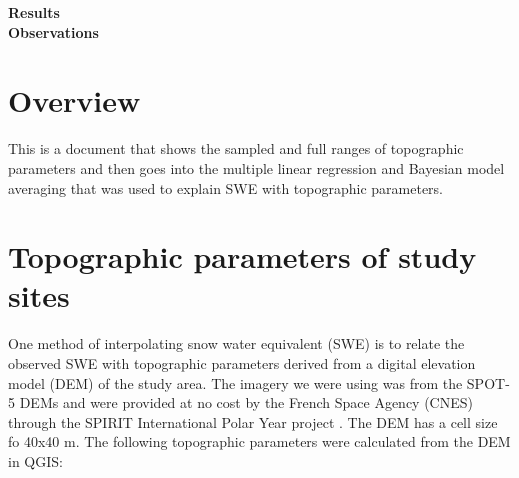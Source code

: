 \documentclass[12pt]{article}
\begin{document}

\begin{center}
\Large \textbf{Results\\ Observations}
\end{center}


\section*{Overview}
This is a document that shows the sampled and full ranges of topographic parameters and then goes into the multiple linear regression and Bayesian model averaging that was used to explain SWE with topographic parameters. 


\pagebreak

\section{Topographic parameters of study sites}

One method of interpolating snow water equivalent (SWE) is to relate the observed SWE with topographic parameters derived from a digital elevation model (DEM) of the study area. The imagery we were using was from the SPOT-5 DEMs and were provided at no cost by the French Space Agency (CNES) through the SPIRIT International Polar Year project \citep{Korona2009}. The DEM has a cell size fo 40x40 m. The following topographic parameters were calculated from the DEM in QGIS:
\end{document}
